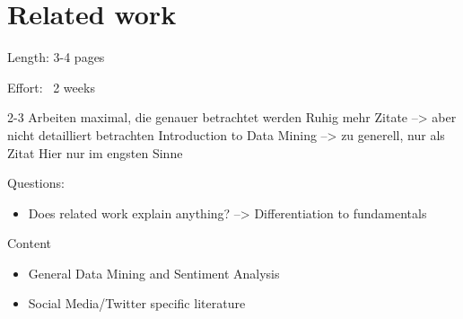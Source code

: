 \chapter{Related work}
\label{cha:Chapter2_RelatedWork}

Length: 3-4 pages

Effort: ~2 weeks

2-3 Arbeiten maximal, die genauer betrachtet werden
Ruhig mehr Zitate --> aber nicht detailliert betrachten
Introduction to Data Mining --> zu generell, nur als Zitat
Hier nur im engsten Sinne

Questions:
\begin{itemize}
\item Does related work explain anything? --> Differentiation to fundamentals
\end{itemize}

Content
\begin{itemize}
\item General Data Mining and Sentiment Analysis
\item Social Media/Twitter specific literature
\end{itemize}




